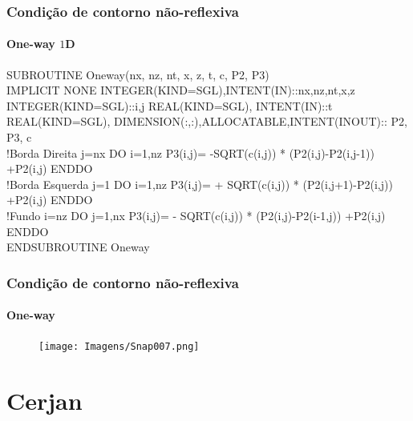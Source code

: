 \documentclass[10pt]{beamer} %
\begin{document}
\begin{frame}
	\frametitle{Condição de contorno não-reflexiva}
	\framesubtitle{One-way $1$D}
\begin{block}{}
			SUBROUTINE Oneway(nx, nz, nt, x, z, t, c, P2, P3)
\linebreak
\\			
  			IMPLICIT NONE
  			INTEGER(KIND=SGL),INTENT(IN)::nx,nz,nt,x,z
  			INTEGER(KIND=SGL)::i,j
  			REAL(KIND=SGL), INTENT(IN)::t
  			REAL(KIND=SGL), DIMENSION(:,:),ALLOCATABLE,INTENT(INOUT):: P2, P3, c
\linebreak
\\
			!Borda Direita
			j=nx 
			DO i=1,nz
  					P3(i,j)= -SQRT(c(i,j)) * (P2(i,j)-P2(i,j-1)) +P2(i,j)
			ENDDO
\linebreak
\\
			!Borda Esquerda
			j=1
			DO i=1,nz
  					P3(i,j)= + SQRT(c(i,j)) * (P2(i,j+1)-P2(i,j)) +P2(i,j)
			ENDDO
\linebreak
\\
			!Fundo
			i=nz
			DO j=1,nx
  					P3(i,j)= - SQRT(c(i,j)) * (P2(i,j)-P2(i-1,j)) +P2(i,j)
			ENDDO
\linebreak
\\
			ENDSUBROUTINE Oneway
\end{block}
\end{frame}	


\begin{frame}
		\frametitle{Condição de contorno não-reflexiva}
		\framesubtitle{One-way}
		\begin{block}{}
			\begin{figure}[H]
				\centering
				\texttt{[image: Imagens/Snap007.png]}
			\end{figure}
		\end{block}
\end{frame}

\section{Cerjan}
\end{document}
